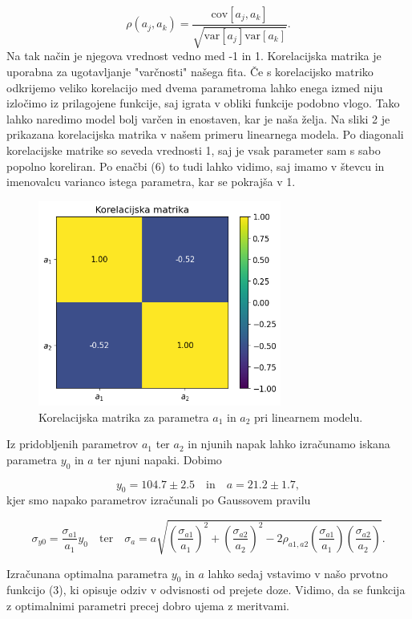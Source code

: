 \documentclass[slovene,11pt,a4paper]{article}
\begin{document}
\begin{equation}
\rho(a_j, a_k) = \frac{\text{cov}[a_j, a_k]}{\sqrt{\text{var}[a_j] \text{var}[a_k]}}.
\end{equation}
Na tak način je njegova vrednost vedno med -1 in 1. Korelacijska matrika je uporabna za ugotavljanje "varčnosti" našega fita. Če s korelacijsko matriko odkrijemo veliko korelacijo med dvema parametroma lahko enega izmed niju izločimo iz prilagojene funkcije, saj igrata v obliki funkcije podobno vlogo. Tako lahko naredimo model bolj varčen in enostaven, kar je naša želja. Na sliki 2 je prikazana korelacijska matrika v našem primeru linearnega modela. Po diagonali korelacijske matrike so seveda vrednosti 1, saj je vsak parameter sam s sabo popolno koreliran. Po enačbi (6) to tudi lahko vidimo, saj imamo v števcu in imenovalcu varianco istega parametra, kar se pokrajša v 1.

\begin{figure}[h!]
\centering
\includegraphics[width=8cm]{farma2.png}
\caption{Korelacijska matrika za parametra $a_1$ in $a_2$ pri linearnem modelu.}
\end{figure}

Iz pridobljenih parametrov $a_1$ ter $a_2$ in njunih napak lahko izračunamo iskana parametra $y_0$ in $a$ ter njuni napaki. Dobimo

\[
y_0 = 104.7 \pm 2.5 \quad \text{in} \quad a = 21.2 \pm 1.7,
\]
kjer smo napako parametrov izračunali po Gaussovem pravilu

\[
\sigma_{y0} = \frac{\sigma_{a1}}{a_1}y_0 \quad \text{ter} \quad
\sigma_{a} = a \sqrt{\left( \frac{\sigma_{a1}}{a_1} \right)^2 + 
\left( \frac{\sigma_{a2}}{a_2} \right)^2 - 
2\rho_{a1,a2} \left( \frac{\sigma_{a1}}{a_1} \right) \left( \frac{\sigma_{a2}}{a_2} \right)
}.
\]

Izračunana optimalna parametra $y_0$ in $a$ lahko sedaj vstavimo v našo prvotno funkcijo (3), ki opisuje odziv v odvisnosti od prejete doze. Vidimo, da se funkcija z optimalnimi parametri precej dobro ujema z meritvami.
\end{document}
